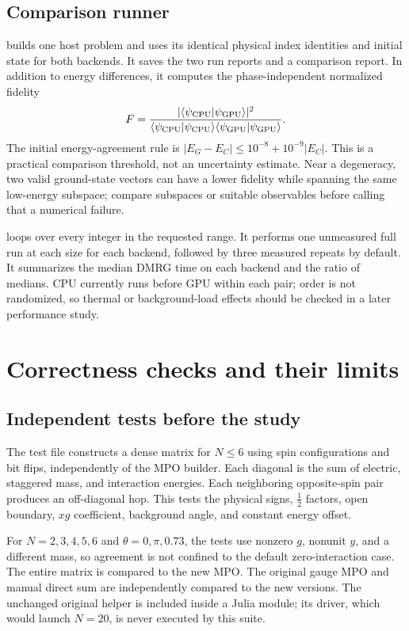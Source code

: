 \subsection{Comparison runner}
 builds one host problem and uses its identical physical index identities and initial state for both backends. It saves the two run reports and a comparison report. In addition to energy differences, it computes the phase-independent normalized fidelity
\begin{equation}
F=\frac{|\langle\psi_{\rm CPU}|\psi_{\rm GPU}\rangle|^2}
{\langle\psi_{\rm CPU}|\psi_{\rm CPU}\rangle\langle\psi_{\rm GPU}|\psi_{\rm GPU}\rangle}.
\end{equation}
The initial energy-agreement rule is $|E_G-E_C|\leq10^{-8}+10^{-9}|E_C|$. This is a practical comparison threshold, not an uncertainty estimate. Near a degeneracy, two valid ground-state vectors can have a lower fidelity while spanning the same low-energy subspace; compare subspaces or suitable observables before calling that a numerical failure.

 loops over every integer in the requested range. It performs one unmeasured full run at each size for each backend, followed by three measured repeats by default. It summarizes the median DMRG time on each backend and the ratio of medians. CPU currently runs before GPU within each pair; order is not randomized, so thermal or background-load effects should be checked in a later performance study.

\section{Correctness checks and their limits}
\subsection{Independent tests before the study}
The test file constructs a dense matrix for $N\leq6$ using spin configurations and bit flips, independently of the MPO builder. Each diagonal is the sum of electric, staggered mass, and interaction energies. Each neighboring opposite-spin pair produces an off-diagonal hop. This tests the physical signs, $\tfrac12$ factors, open boundary, $xg$ coefficient, background angle, and constant energy offset.

For $N=2,3,4,5,6$ and $\theta=0,\pi,0.73$, the tests use nonzero $g$, nonunit $y$, and a different mass, so agreement is not confined to the default zero-interaction case. The entire matrix is compared to the new MPO. The original gauge MPO and manual direct sum are independently compared to the new versions. The unchanged original helper is included inside a Julia module; its driver, which would launch $N=20$, is never executed by this suite.

